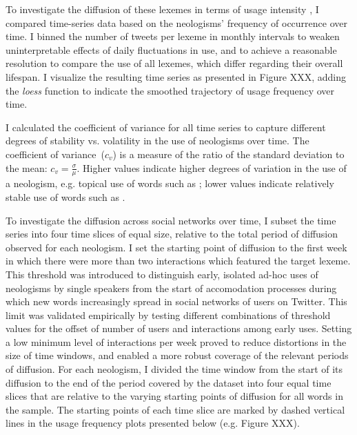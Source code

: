 \documentclass[
  a4paper,
  abstract=on,
  captions=tableabove
  ]{scrartcl}
\begin{document}
  To investigate the diffusion of these lexemes in terms of usage intensity \parencite{Stefanowitsch2017CorpusbasedPerspective}, I compared time-series data based on the neologisms' frequency of occurrence over time. I binned the number of tweets per lexeme in monthly intervals to weaken uninterpretable effects of daily fluctuations in use, and to achieve a reasonable resolution to compare the use of all lexemes, which differ regarding their overall lifespan. I visualize the resulting time series as presented in Figure XXX, adding the \emph{loess} function to indicate the smoothed trajectory of usage frequency over time.

  I calculated the coefficient of variance for all time series to capture different degrees of stability vs. volatility in the use of neologisms over time. The coefficient of variance~($c_{v}$) is a measure of the ratio of the standard deviation to the mean: $c_{v} = \frac{\sigma}{\mu}$. Higher values indicate higher degrees of variation in the use of a neologism, e.g. topical use of words such as ; lower values indicate relatively stable use of words such as .

  To investigate the diffusion across social networks over time, I subset the time series into four time slices of equal size, relative to the total period of diffusion observed for each neologism. I set the starting point of diffusion to the first week in which there were more than two interactions which featured the target lexeme. This threshold was introduced to distinguish early, isolated ad-hoc uses of neologisms by single speakers from the start of accomodation processes during which new words increasingly spread in social networks of users on Twitter. This limit was validated empirically by testing different combinations of threshold values for the offset of number of users and interactions among early uses. Setting a low minimum level of interactions per week proved to reduce distortions in the size of time windows, and enabled a more robust coverage of the relevant periods of diffusion. For each neologism, I divided the time window from the start of its diffusion to the end of the period covered by the dataset into four equal time slices that are relative to the varying starting points of diffusion for all words in the sample. The starting points of each time slice are marked by dashed vertical lines in the usage frequency plots presented below (e.g. Figure XXX).
\end{document}
